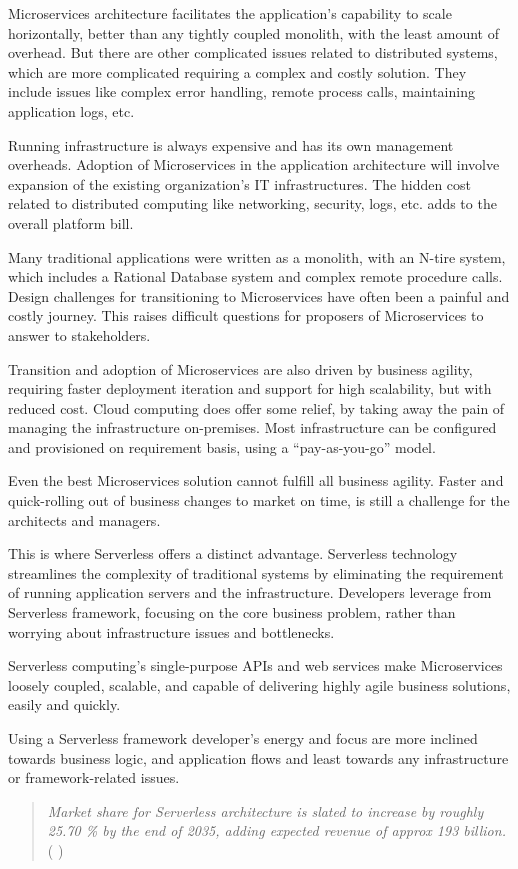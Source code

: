 \documentclass{article}
\begin{document}
\begin{flushleft}
Microservices architecture facilitates the application’s capability to scale horizontally, better than any tightly coupled monolith, with the least amount of overhead. But there are other complicated issues related to distributed systems, which are more complicated requiring a complex and costly solution. They include issues like complex error handling, remote process calls, maintaining application logs, etc.

Running infrastructure is always expensive and has its own management overheads. Adoption of Microservices in the application architecture will involve expansion of the existing organization’s IT infrastructures. The hidden cost related to distributed computing like networking, security, logs, etc. adds to the overall platform bill.

Many traditional applications were written as a monolith, with an N-tire system, which includes a Rational Database system and complex remote procedure calls. Design challenges for transitioning to Microservices have often been a painful and costly journey. This raises difficult questions for proposers of Microservices to answer to stakeholders.

Transition and adoption of Microservices are also driven by business agility, requiring faster deployment iteration and support for high scalability, but with reduced cost. 
Cloud computing does offer some relief, by taking away the pain of managing the infrastructure on-premises. Most infrastructure can be configured and provisioned on requirement basis, using a “pay-as-you-go” model. 

Even the best Microservices solution cannot fulfill all business agility. Faster and quick-rolling out of business changes to market on time, is still a challenge for the architects and managers. 

This is where Serverless offers a distinct advantage. Serverless technology streamlines the complexity of traditional systems by eliminating the requirement of running application servers and the infrastructure. Developers leverage from Serverless framework, focusing on the core business problem, rather than worrying about infrastructure issues and bottlenecks.

Serverless computing's single-purpose APIs and web services make Microservices loosely coupled, scalable, and capable of delivering highly agile business solutions, easily and quickly.

Using a Serverless framework developer’s energy and focus are more inclined towards business logic, and application flows and least towards any infrastructure or framework-related issues.
\pagebreak
\end{flushleft}
\begin{quote}
   \textit{Market share for Serverless architecture is slated to increase by roughly 25.70 \% by the end of 2035, adding expected revenue of approx 193 billion. } \\ ( \cite{GMI_3796_2022} )
\end{quote}
\end{document}
